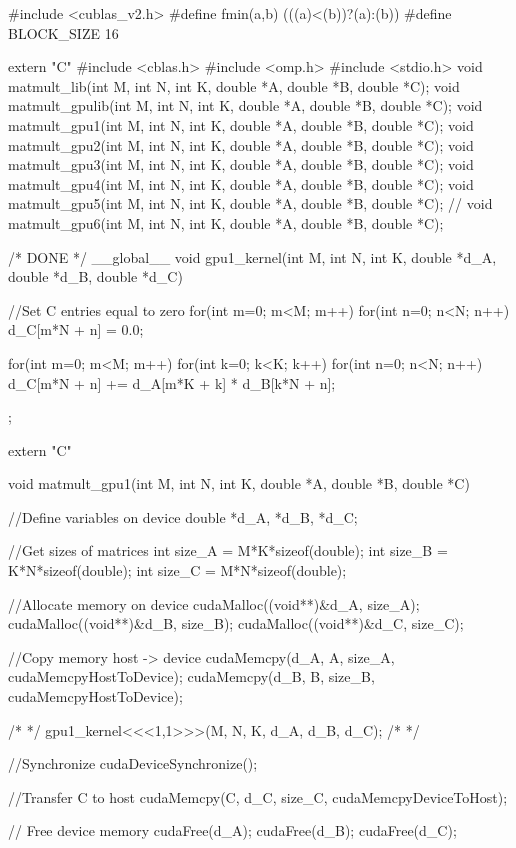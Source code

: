 #include <cublas_v2.h>
#define fmin(a,b) (((a)<(b))?(a):(b))
#define BLOCK_SIZE 16

extern "C" { 
    #include <cblas.h> 
    #include <omp.h>
    #include <stdio.h>
    void matmult_lib(int M, int N, int K, double *A, double *B, double *C);
    void matmult_gpulib(int M, int N, int K, double *A, double *B, double *C);
    void matmult_gpu1(int M, int N, int K, double *A, double *B, double *C);
    void matmult_gpu2(int M, int N, int K, double *A, double *B, double *C);
    void matmult_gpu3(int M, int N, int K, double *A, double *B, double *C);
    void matmult_gpu4(int M, int N, int K, double *A, double *B, double *C);
    void matmult_gpu5(int M, int N, int K, double *A, double *B, double *C);
    // void matmult_gpu6(int M, int N, int K, double *A, double *B, double *C);
}


/*          DONE            */
__global__ void gpu1_kernel(int M, int N, int K, double *d_A, double *d_B, double *d_C){
    //Set C entries equal to zero 
    for(int m=0; m<M; m++){
        for(int n=0; n<N; n++){
            d_C[m*N + n] = 0.0;
        }
    }
    
    for(int m=0; m<M; m++){
        for(int k=0; k<K; k++){
            for(int n=0; n<N; n++){
                d_C[m*N + n] += d_A[m*K + k] * d_B[k*N + n];
            }
        }
    }
};

extern "C" { 
void matmult_gpu1(int M, int N, int K, double *A, double *B, double *C) { 

    //Define variables on device
    double *d_A, *d_B, *d_C;

    //Get sizes of matrices
    int size_A = M*K*sizeof(double);
    int size_B = K*N*sizeof(double);
    int size_C = M*N*sizeof(double);

    //Allocate memory on device
    cudaMalloc((void**)&d_A, size_A);
    cudaMalloc((void**)&d_B, size_B);
    cudaMalloc((void**)&d_C, size_C);

    //Copy memory host -> device
    cudaMemcpy(d_A, A, size_A, cudaMemcpyHostToDevice);
    cudaMemcpy(d_B, B, size_B, cudaMemcpyHostToDevice); 

    /* */
    gpu1_kernel<<<1,1>>>(M, N, K, d_A, d_B, d_C);
    /* */
    
    //Synchronize
    cudaDeviceSynchronize(); 
    
    //Transfer C to host
    cudaMemcpy(C, d_C, size_C, cudaMemcpyDeviceToHost);

    // Free device memory
    cudaFree(d_A);
    cudaFree(d_B);
    cudaFree(d_C);
}
}


